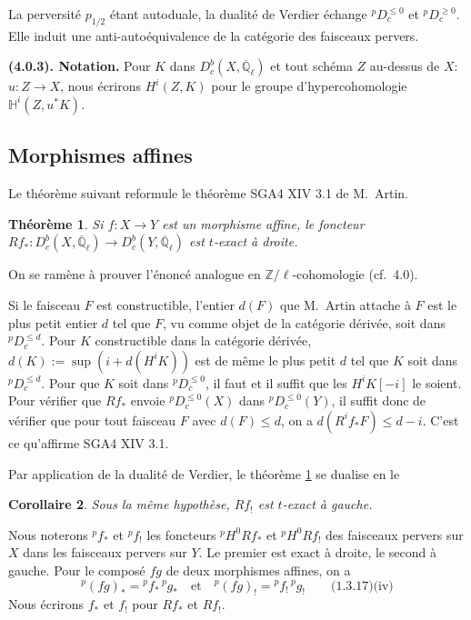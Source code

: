 \documentclass[12pt,a4paper]{article}
\theoremstyle{plain}
\newtheorem{theorem}{Th\'{e}or\`{e}me}[section]
\newtheorem{corollary}[theorem]{Corollaire}
\theoremstyle{definition}
\begin{document}
La perversit\'{e} $p_{1/2}$ \'{e}tant autoduale, la dualit\'{e} de Verdier \'{e}change ${}^{p}D_{c}^{\leq 0}$ et ${}^{p}D_{c}^{\geq 0}$. Elle induit une anti-auto\'{e}quivalence de la cat\'{e}gorie des faisceaux pervers.

\noindent\textbf{(4.0.3). Notation.} Pour $K$ dans $D_{c}^{b}(X,\overline{\mathbb{Q}}_{\ell})$ et tout sch\'{e}ma $Z$ au-dessus de $X$: $u: Z \to X$, nous \'{e}crirons $H^{i}(Z,K)$ pour le groupe d'hypercohomologie $\mathbb{H}^{i}(Z, u^{*}K)$.

\subsection{Morphismes affines}

Le th\'{e}or\`{e}me suivant reformule le th\'{e}or\`{e}me SGA4 XIV 3.1 de M.~Artin.

\begin{theorem}\label{thm:4.1.1}
Si $f: X \to Y$ est un morphisme affine, le foncteur $Rf_{*}: D_{c}^{b}(X,\overline{\mathbb{Q}}_{\ell}) \to D_{c}^{b}(Y,\overline{\mathbb{Q}}_{\ell})$ est $t$-exact \`{a} droite.
\end{theorem}

On se ram\`{e}ne \`{a} prouver l'\'{e}nonc\'{e} analogue en $\mathbb{Z}/\ell$-cohomologie (cf.\ 4.0).

Si le faisceau $F$ est constructible, l'entier $d(F)$ que M.~Artin attache \`{a} $F$ est le plus petit entier $d$ tel que $F$, vu comme objet de la cat\'{e}gorie d\'{e}riv\'{e}e, soit dans ${}^{p}D_{c}^{\leq d}$. Pour $K$ constructible dans la cat\'{e}gorie d\'{e}riv\'{e}e, $d(K) := \sup(i + d(H^{i}K))$ est de m\^{e}me le plus petit $d$ tel que $K$ soit dans ${}^{p}D_{c}^{\leq d}$. Pour que $K$ soit dans ${}^{p}D_{c}^{\leq 0}$, il faut et il suffit que les $H^{i}K[-i]$ le soient. Pour v\'{e}rifier que $Rf_{*}$ envoie ${}^{p}D_{c}^{\leq 0}(X)$ dans ${}^{p}D_{c}^{\leq 0}(Y)$, il suffit donc de v\'{e}rifier que pour tout faisceau $F$ avec $d(F) \leq d$, on a $d(R^{i}f_{*}F) \leq d-i$. C'est ce qu'affirme SGA4 XIV 3.1.

Par application de la dualit\'{e} de Verdier, le th\'{e}or\`{e}me \ref{thm:4.1.1} se dualise en le

\begin{corollary}\label{cor:4.1.2}
Sous la m\^{e}me hypoth\`{e}se, $Rf_{!}$ est $t$-exact \`{a} gauche.
\end{corollary}

Nous noterons ${}^{p}f_{*}$ et ${}^{p}f_{!}$ les foncteurs ${}^{p}H^{0}Rf_{*}$ et ${}^{p}H^{0}Rf_{!}$ des faisceaux pervers sur $X$ dans les faisceaux pervers sur $Y$. Le premier est exact \`{a} droite, le second \`{a} gauche. Pour le compos\'{e} $fg$ de deux morphismes affines, on a
\[
{}^{p}(fg)_{*} = {}^{p}f_{*}\,{}^{p}g_{*} \quad \text{et} \quad {}^{p}(fg)_{!} = {}^{p}f_{!}\,{}^{p}g_{!}\qquad \text{(1.3.17)(iv)}
\]
Nous \'{e}crirons $f_{*}$ et $f_{!}$ pour $Rf_{*}$ et $Rf_{!}$.
\end{document}
